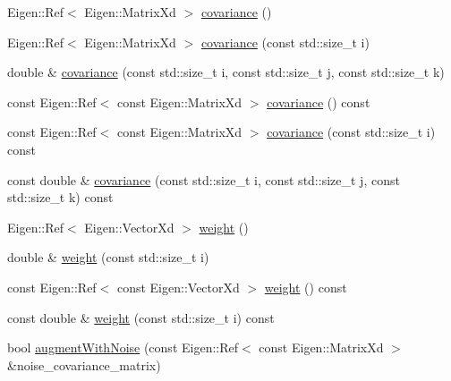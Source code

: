 \begin{DoxyCompactItemize}
\item 
Eigen\+::\+Ref$<$ Eigen\+::\+Matrix\+Xd $>$ \mbox{\hyperlink{classbfl_1_1GaussianMixture_a65a60ef46d16ac33196a09963bbccdee}{covariance}} ()
\item 
Eigen\+::\+Ref$<$ Eigen\+::\+Matrix\+Xd $>$ \mbox{\hyperlink{classbfl_1_1GaussianMixture_a80a6fa7d9edfc95103236378b4da3f7f}{covariance}} (const std\+::size\+\_\+t i)
\item 
double \& \mbox{\hyperlink{classbfl_1_1GaussianMixture_ad2c74407e682e3b4322df2d0e1cef28e}{covariance}} (const std\+::size\+\_\+t i, const std\+::size\+\_\+t j, const std\+::size\+\_\+t k)
\item 
const Eigen\+::\+Ref$<$ const Eigen\+::\+Matrix\+Xd $>$ \mbox{\hyperlink{classbfl_1_1GaussianMixture_a172c11264e6ff449a44ec21701eadc4d}{covariance}} () const
\item 
const Eigen\+::\+Ref$<$ const Eigen\+::\+Matrix\+Xd $>$ \mbox{\hyperlink{classbfl_1_1GaussianMixture_a3cff0f507ed950fe6a5e0aba1bf8467a}{covariance}} (const std\+::size\+\_\+t i) const
\item 
const double \& \mbox{\hyperlink{classbfl_1_1GaussianMixture_a4ca0b098be0fc923f454e73e9dccf78f}{covariance}} (const std\+::size\+\_\+t i, const std\+::size\+\_\+t j, const std\+::size\+\_\+t k) const
\item 
Eigen\+::\+Ref$<$ Eigen\+::\+Vector\+Xd $>$ \mbox{\hyperlink{classbfl_1_1GaussianMixture_ada5625de6a3e2f98afb5aaa148503dad}{weight}} ()
\item 
double \& \mbox{\hyperlink{classbfl_1_1GaussianMixture_a44885fb208e33f37015d47f55d02ef50}{weight}} (const std\+::size\+\_\+t i)
\item 
const Eigen\+::\+Ref$<$ const Eigen\+::\+Vector\+Xd $>$ \mbox{\hyperlink{classbfl_1_1GaussianMixture_a9ef04270bbccfe01f481665a1f390167}{weight}} () const
\item 
const double \& \mbox{\hyperlink{classbfl_1_1GaussianMixture_a42672f88d9126f018715a4d258a57731}{weight}} (const std\+::size\+\_\+t i) const
\item 
bool \mbox{\hyperlink{classbfl_1_1GaussianMixture_aec4e807341e18c18faed041c41121cb7}{augment\+With\+Noise}} (const Eigen\+::\+Ref$<$ const Eigen\+::\+Matrix\+Xd $>$ \&noise\+\_\+covariance\+\_\+matrix)
\end{DoxyCompactItemize}
